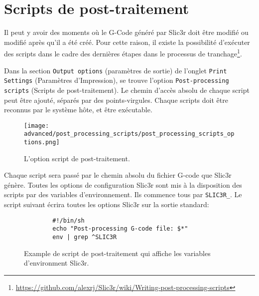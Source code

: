 
\section{Scripts de post-traitement} %
\label{sec:post_processing_scripts}

Il peut y avoir des moments o\`u le G-Code g\'en\'er\'e par Slic3r doit \^etre modifi\'e ou modifi\'e apr\`es qu'il a \'et\'e cr\'e\'e. Pour cette raison, il existe la possibilit\'e d'ex\'ecuter des scripts dans le cadre des derni\`eres \'etapes dans le processus de tranchage\footnote{\url{https://github.com/alexrj/Slic3r/wiki/Writing-post-processing-scripts}}.

Dans la section \texttt{Output options} (param\`etres de sortie) de l'onglet \texttt{Print Settings} (Param\`etres d'Impression), se trouve l'option \texttt{Post-processing scripts} (Scripts de post-traitement).  Le chemin d'acc\`es absolu de chaque script peut \^etre ajout\'e, s\'epar\'es par des points-virgules. Chaque scripts doit \^etre reconnus par le syst\`eme h\^ote, et \^etre ex\'ecutable.

\begin{figure}[H]
\centering
\texttt{[image: advanced/post\_processing\_scripts/post\_processing\_scripts\_options.png]}
\caption{L'option script de post-traitement.}
\label{fig:post_processing_scripts_options}
\end{figure}

Chaque script sera pass\'e par le chemin absolu du fichier G-code que Slic3r g\'en\`ere. Toutes les options de configuration Slic3r sont mis \`a la disposition des scripts par des variables d'environnement.  Ils commence tous par \texttt{SLIC3R\_}.  Le script suivant \'ecrira toutes les options Slic3r sur la sortie standard:

\begin{figure}[H]
\small
\begin{verbatim}
        #!/bin/sh
        echo "Post-processing G-code file: $*"
        env | grep ^SLIC3R
\end{verbatim}
\caption{Example de script de post-traitement qui affiche les variables d'environment Slic3r.}
\label{fig:exaple_post_processing_script_env_vars}
\end{figure}

